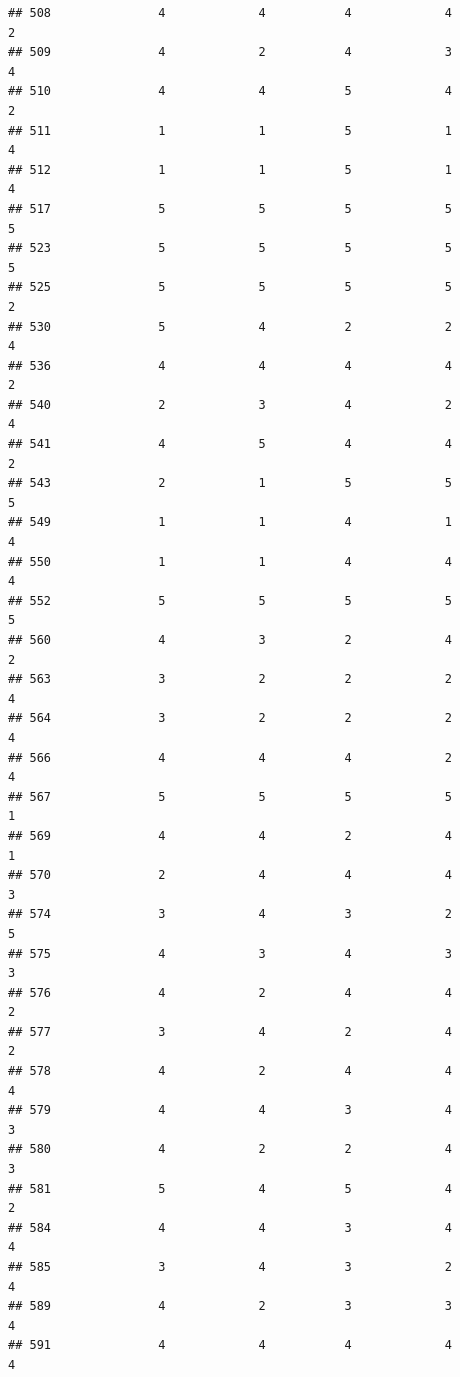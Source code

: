 \documentclass[
]{article}
\begin{document}
\begin{verbatim}
## 508               4             4           4             4            2
## 509               4             2           4             3            4
## 510               4             4           5             4            2
## 511               1             1           5             1            4
## 512               1             1           5             1            4
## 517               5             5           5             5            5
## 523               5             5           5             5            5
## 525               5             5           5             5            2
## 530               5             4           2             2            4
## 536               4             4           4             4            2
## 540               2             3           4             2            4
## 541               4             5           4             4            2
## 543               2             1           5             5            5
## 549               1             1           4             1            4
## 550               1             1           4             4            4
## 552               5             5           5             5            5
## 560               4             3           2             4            2
## 563               3             2           2             2            4
## 564               3             2           2             2            4
## 566               4             4           4             2            4
## 567               5             5           5             5            1
## 569               4             4           2             4            1
## 570               2             4           4             4            3
## 574               3             4           3             2            5
## 575               4             3           4             3            3
## 576               4             2           4             4            2
## 577               3             4           2             4            2
## 578               4             2           4             4            4
## 579               4             4           3             4            3
## 580               4             2           2             4            3
## 581               5             4           5             4            2
## 584               4             4           3             4            4
## 585               3             4           3             2            4
## 589               4             2           3             3            4
## 591               4             4           4             4            4

\end{verbatim}
\end{document}
